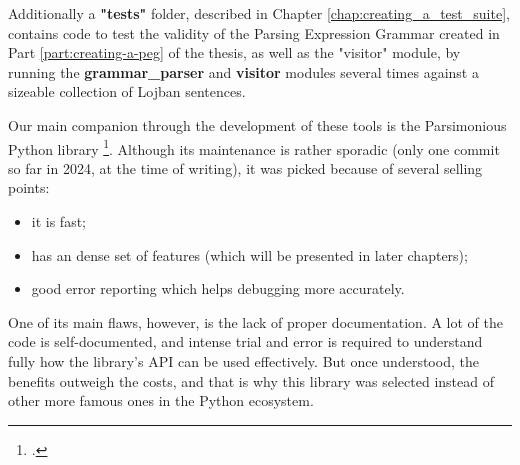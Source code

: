 Additionally a \textbf{"tests"} folder, described in Chapter \ref{chap:creating_a_test_suite}, contains code to
test the validity of the Parsing Expression Grammar created in Part \ref{part:creating-a-peg} of the thesis, as well
as the "visitor" module, by running the \textbf{grammar\_parser} and \textbf{visitor} modules several times against a
sizeable collection of Lojban sentences.\newline

Our main companion through the development of these tools is the Parsimonious Python library \footcite{parsimonious}.
Although its maintenance is rather sporadic (only one commit so far in 2024, at the time of writing), it was picked because of
several selling points:

\begin{itemize}
\item it is fast;
\item has an dense set of features (which will be presented in later chapters);
\item good error reporting which helps debugging more accurately.
\end{itemize}

One of its main flaws, however, is the lack of proper documentation. A lot of the code is self-documented, and intense
trial and error is required to understand fully how the library's API can be used effectively. But once understood, the
benefits outweigh the costs, and that is why this library was selected instead of other more famous ones in the Python ecosystem.